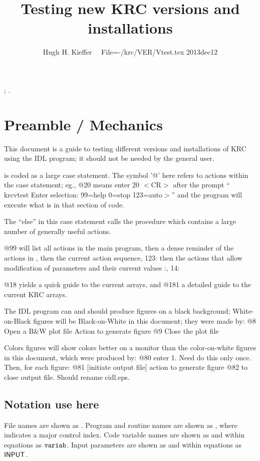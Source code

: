 \documentclass{article}  %
\title{Testing new KRC versions and installations}
\author{Hugh H. Kieffer  \ \ File=-/krc/VER/Vtest.tex 2013dec12}
\begin{document}
\maketitle
\tableofcontents
; \hrulefill .\hrulefill

\section{Preamble / Mechanics}
This document is a guide to testing different versions and installations of KRC using the  IDL program; it
should not be needed by the general user.

  is coded as a large case statement. The symbol '@' here
 refers to actions within the case statement; eg., @20 means enter 20 $<$CR$>$ after
 the prompt `` krcvtest Enter selection: 99=help 0=stop 123=auto$>$'' and the
 program will execute what is in that section of code.

The ``else'' in this case statement calls the procedure  which contains a large number of generally useful actions. 

@99 will list all actions in the main program, 
\qi then a dense reminder of the actions in , 
\qi then the current action sequence, 123:
\qi then the actions that allow modification of parameters and their current values
:, 14: 

@18 yields a quick guide to the current arrays, and @181 a detailed guide to the current KRC arrays.

The IDL program can and should produce figures on a black background; White-on-Black figures will be Black-on-White in this document; they were made by:
\qi @8 Open a B\&W  plot file
\qii  Action to generate figure
\qi @9 Close the plot file
 
Colors figures will show colors better on a monitor than the color-on-white figures in this document, which were produced by:
\qi @80  enter 1.  Need do this only once.  Then, for each figure:
\qi @81 [initiate output file]
\qi  action to generate figure
\qi @82  to close output file. Should rename cidl.eps.

\subsection{Notation use here}

File names are shown as . 
Program and routine names are shown as  , where 
indicates a major control index. 
Code variable names are shown as  and within equations as $\mathtt{varia
b}$.  
Input parameters are shown as  and within equations as $\mathsf{INPUT}$.
\end{document}
